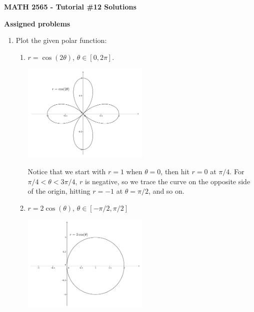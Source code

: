 \documentclass[12pt]{article}
\begin{document}
\author{Instructor: Sean Fitzpatrick}
\thispagestyle{empty}
\begin{center}
{\bf MATH 2565 - Tutorial \#12 Solutions}
\end{center}







\textbf{Assigned problems}

 \begin{enumerate}
\item Plot the given polar function:

\begin{enumerate}
\item $r=\cos(2\theta)$, $\theta\in [0,2\pi]$.


\begin{center}
 \includegraphics[width=0.5\textwidth]{WS6-1b}
\end{center}

Notice that we start with $r=1$ when $\theta=0$, then hit $r=0$ at $\pi/4$. For $\pi/4<\theta<3\pi/4$, $r$ is negative, so we trace the curve on the opposite side of the origin, hitting $r=-1$ at $\theta=\pi/2$, and so on.

\item $r=2\cos(\theta)$, $\theta\in [-\pi/2,\pi/2]$

\begin{center}
 \includegraphics[width=0.5\textwidth]{WS6-1c}
\end{center}


\end{enumerate}
\end{enumerate}
\end{document}
